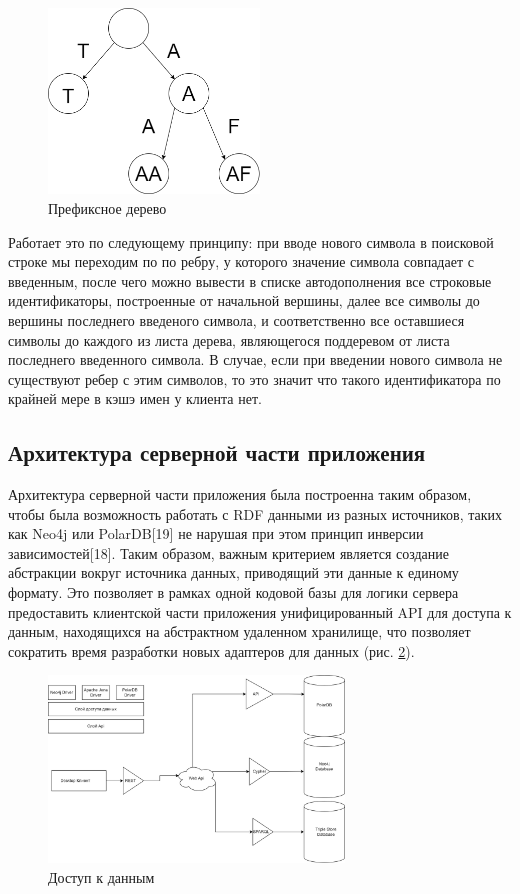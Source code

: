 \documentclass[12pt]{article}
\begin{document}
\begin{figure}[!ht]
    \centering
    \includegraphics[width=0.5\textwidth]{_images/prefix_tree.png}
    \caption{Префиксное дерево}
    \label{fig:prefix_tree}
\end{figure}

Работает это по следующему принципу: при вводе нового символа в поисковой строке мы переходим по по ребру, у которого значение символа совпадает с введенным, после чего можно вывести в списке автодополнения все строковые идентификаторы, построенные от начальной вершины, далее все символы до вершины последнего введеного символа, и соответственно все оставшиеся символы до каждого из листа дерева, являющегося поддеревом от листа последнего введенного символа. В случае, если при введении нового символа не существуют ребер с этим символов, то это значит что такого идентификатора по крайней мере в кэшэ имен у клиента нет.

\pagebreak

\subsection{Архитектура серверной части приложения}
\qquad Архитектура серверной части приложения была построенна таким образом, чтобы была возможность работать с RDF данными из разных источников, таких как Neo4j или PolarDB[19] не нарушая при этом принцип инверсии зависимостей[18]. Таким образом, важным критерием является создание абстракции вокруг источника данных, приводящий эти данные к единому формату. Это позволяет в рамках одной кодовой базы для логики сервера предоставить клиентской части приложения унифицированный API для доступа к данным, находящихся на  абстрактном удаленном хранилище, что позволяет сократить время разработки новых адаптеров для данных (рис. \ref{fig:data_access}).

\begin{figure}[!ht]
    \centering
    \includegraphics[width=0.7\textwidth]{_images/data_access.png}
    \caption{Доступ к данным}
    \label{fig:data_access}
\end{figure}
\end{document}
